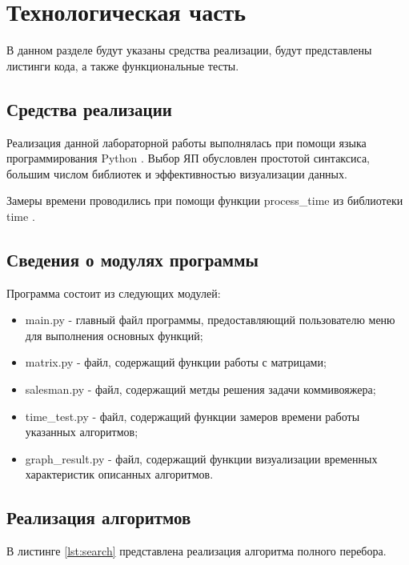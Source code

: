 \chapter{Технологическая часть}

В данном разделе будут указаны средства реализации, будут представлены листинги кода, а также функциональные тесты.

\section{Средства реализации}

Реализация данной лабораторной работы выполнялась при помощи языка программирования Python \cite{python}. Выбор ЯП обусловлен простотой синтаксиса, большим числом библиотек и эффективностью визуализации данных.

Замеры времени проводились при помощи функции process\_time из библиотеки time \cite{python-time}.

\section{Сведения о модулях программы}

Программа состоит из следующих модулей:

\begin{itemize}
	\item main.py - главный файл программы, предоставляющий пользователю меню для выполнения основных функций;
	\item matrix.py - файл, содержащий функции работы с матрицами;
	\item salesman.py - файл, содержащий метды решения задачи коммивояжера;
	\item time\_test.py - файл, содержащий функции замеров времени работы указанных алгоритмов;
	\item graph\_result.py - файл, содержащий функции визуализации временных характеристик описанных алгоритмов.
\end{itemize}

\section{Реализация алгоритмов}

В листинге \ref{lst:search} представлена реализация алгоритма полного перебора.



